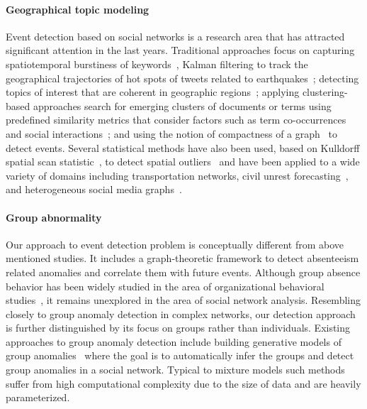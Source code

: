 \paragraph{Geographical topic modeling}
Event detection based on social networks is a research area that has attracted significant attention in the last years. Traditional approaches focus on capturing spatiotemporal burstiness of keywords~\cite{lappas2009burstiness,lappas2012spatiotemporal}, Kalman filtering to track the geographical trajectories of hot spots of tweets related to earthquakes~\cite{sakaki2010earthquake}; detecting topics of interest that are coherent in geographic regions~\cite{eisenstein2010latent,hong2012discovering,yin2011geographical}; applying clustering-based approaches search for emerging clusters of documents or terms using predefined similarity metrics that consider factors such as term co-occurrences and social interactions~\cite{aggarwal2012event,sayyadi2009event,watanabe2011jasmine,weng2011event}; and using the notion of compactness of a graph~\cite{rozenshtein2014event} to detect events. Several statistical methods have also been used, based on Kulldorff  spatial scan statistic~\cite{kulldorff1997spatial}, to detect spatial outliers~\cite{chen2008detecting} and have been applied to a wide variety of domains including transportation networks, civil unrest forecasting~\cite{zhao2014unsupervised}, and heterogeneous social media graphs~\cite{chen2014non}.

\paragraph{Group abnormality}
Our approach to event detection problem is conceptually different from above mentioned studies. It includes a graph-theoretic framework to detect absenteeism related anomalies and correlate them with future events. Although group absence behavior has been widely studied in the area of organizational behavioral studies~\cite{gaudine2001effects,seamonds1982stress,chi2015ghost}, it remains unexplored in the area of social network analysis. Resembling closely to group anomaly detection in complex networks, our detection approach is further distinguished by its focus on groups rather than individuals. Existing approaches to group anomaly detection include building generative models of group anomalies~\cite{xiong2011hierarchical,yu2014glad} where the goal is to automatically infer the groups and detect group anomalies in a social network. Typical to mixture models such methods suffer from high computational complexity due to the size of data and are heavily parameterized.

